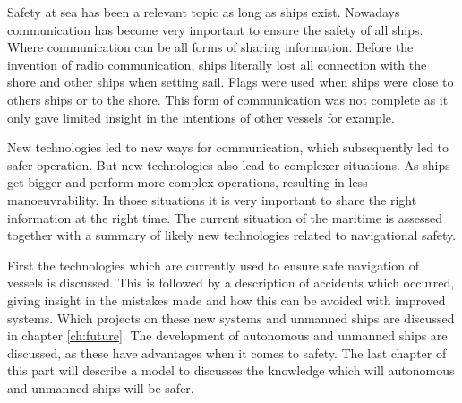 Safety at sea has been a relevant topic as long as ships exist. Nowadays communication has become very important to ensure the safety of all ships. Where communication can be all forms of sharing information. Before the invention of radio communication, ships literally lost all connection with the shore and other ships when setting sail. Flags were used when ships were close to others ships or to the shore. This form of communication was not complete as it only gave limited insight in the intentions of other vessels for example.

New technologies led to new ways for communication, which subsequently led to safer operation. But new technologies also lead to complexer situations. As ships get bigger and perform more complex operations, resulting in less manoeuvrability. In those situations it is very important to share the right information at the right time. The current situation of the maritime is assessed together with a summary of likely new technologies related to navigational safety. 

First the technologies which are currently used to ensure safe navigation of vessels is discussed. This is followed by a description of accidents which occurred, giving insight in the mistakes made and how this can be avoided with improved systems. Which projects on these new systems and unmanned ships are discussed in chapter \ref{ch:future}. The development of autonomous and unmanned ships are discussed, as these have advantages when it comes to safety. The last chapter of this part will describe a model to discusses the knowledge which will autonomous and unmanned ships will be safer.